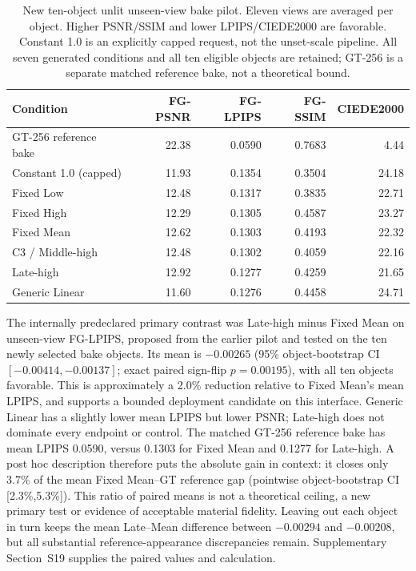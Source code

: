 \documentclass[times,twocolumn,final]{elsarticle}
\begin{document}
\begin{table}[ht]
\centering\scriptsize
\caption{New ten-object unlit unseen-view bake pilot. Eleven views are averaged per object. Higher PSNR/SSIM and lower LPIPS/CIEDE2000 are favorable. Constant 1.0 is an explicitly capped request, not the unset-scale pipeline. All seven generated conditions and all ten eligible objects are retained; GT-256 is a separate matched reference bake, not a theoretical bound.}
\label{tab:new-bake}
\begin{tabular}{lrrrr}
\toprule Condition & FG-PSNR & FG-LPIPS & FG-SSIM & CIEDE2000 \\
\midrule
GT-256 reference bake & 22.38 & 0.0590 & 0.7683 & 4.44 \\
\midrule
Constant 1.0 (capped) & 11.93 & 0.1354 & 0.3504 & 24.18 \\
Fixed Low & 12.48 & 0.1317 & 0.3835 & 22.71 \\
Fixed High & 12.29 & 0.1305 & 0.4587 & 23.27 \\
Fixed Mean & 12.62 & 0.1303 & 0.4193 & 22.32 \\
C3 / Middle-high & 12.48 & 0.1302 & 0.4059 & 22.16 \\
Late-high & 12.92 & 0.1277 & 0.4259 & 21.65 \\
Generic Linear & 11.60 & 0.1276 & 0.4458 & 24.71 \\
\bottomrule\end{tabular}
\end{table}

The internally predeclared primary contrast was Late-high minus Fixed Mean on unseen-view FG-LPIPS, proposed from the earlier pilot and tested on the ten newly selected bake objects. Its mean is $-0.00265$ (95\% object-bootstrap CI $[-0.00414,-0.00137]$; exact paired sign-flip $p=0.00195$), with all ten objects favorable. This is approximately a 2.0\% reduction relative to Fixed Mean's mean LPIPS, and supports a bounded deployment candidate on this interface. Generic Linear has a slightly lower mean LPIPS but lower PSNR; Late-high does not dominate every endpoint or control. The matched GT-256 reference bake has mean LPIPS 0.0590, versus 0.1303 for Fixed Mean and 0.1277 for Late-high. A post hoc description therefore puts the absolute gain in context: it closes only 3.7\% of the mean Fixed Mean--GT reference gap (pointwise object-bootstrap CI [2.3\%,5.3\%]). This ratio of paired means is not a theoretical ceiling, a new primary test or evidence of acceptable material fidelity. Leaving out each object in turn keeps the mean Late--Mean difference between $-0.00294$ and $-0.00208$, but all substantial reference-appearance discrepancies remain. Supplementary Section~S19 supplies the paired values and calculation.
\end{document}

